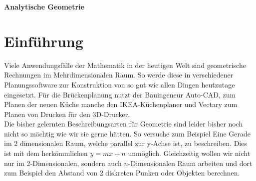 \documentclass[a4paper,12pt]{article}
\newcommand{\Uebungsblatt}{Analytische Geometrie}
\begin{document}
	\pagestyle{fancy}
	\begin{center}
		\LARGE \sf \textbf{ \Uebungsblatt{}}
	\end{center}
	
	\vspace*{0.1cm}
	\tableofcontents
	\newpage
	\vspace*{0.1cm}
		
	
	\section{Einführung}
	Viele Anwendungsfälle der Mathematik in der heutigen Welt sind geometrische Rechnungen im Mehrdimensionalen Raum. So werde diese in verschiedener Planungssoftware zur Konstruktion von so gut wie allen Dingen heutzutage eingesetzt. Für die Brückenplanung nutzt der Bauingeneur Auto-CAD, zum Planen der neuen Küche manche den IKEA-Küchenplaner und Vectary zum Planen von Drucken für den 3D-Drucker.\\
	Die bisher gelernten Beschreibungsarten für Geometrie sind leider bisher noch nicht so mächtig wie wir sie gerne hätten. So versuche zum Beispiel Eine Gerade im 2 dimensionalen Raum, welche parallel zur y-Achse ist, zu beschreiben. Dies ist mit dem herkömmlichen $y=mx+n$ unmöglich. Gleichzeitig wollen wir nicht nur im 2-Dimensionalen, sondern auch $n$-Dimensionalen Raum arbeiten und dort zum Beispiel den Abstand von 2 diskreten Punken oder Objekten berechnen.\\ 
\end{document}

